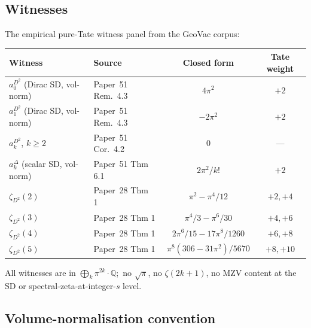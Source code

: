 \documentclass[11pt,a4paper]{article}
\theoremstyle{plain}
\theoremstyle{definition}
\newcommand{\Q}{\mathbb{Q}}
\begin{document}
\subsection{Witnesses}

The empirical pure-Tate witness panel from the GeoVac corpus:

\begin{center}
\begin{tabular}{@{}llcc@{}}
\toprule
Witness & Source & Closed form & Tate weight \\
\midrule
$a_0^{D^2}$ (Dirac SD, vol-norm) & Paper~51 Rem.~4.3~\cite{loutey_paper51} & $4\pi^2$ & $+2$ \\
$a_1^{D^2}$ (Dirac SD, vol-norm) & Paper~51 Rem.~4.3 & $-2\pi^2$ & $+2$ \\
$a_k^{D^2}$, $k \ge 2$ & Paper~51 Cor.~4.2 & $0$ & --- \\
$a_k^\Delta$ (scalar SD, vol-norm) & Paper~51 Thm 6.1 & $2\pi^2/k!$ & $+2$ \\
$\zeta_{D^2}(2)$ & Paper~28 Thm 1~\cite{loutey_paper28} & $\pi^2 - \pi^4/12$ & $+2, +4$ \\
$\zeta_{D^2}(3)$ & Paper~28 Thm 1 & $\pi^4/3 - \pi^6/30$ & $+4, +6$ \\
$\zeta_{D^2}(4)$ & Paper~28 Thm 1 & $2\pi^6/15 - 17\pi^8/1260$ & $+6, +8$ \\
$\zeta_{D^2}(5)$ & Paper~28 Thm 1 & $\pi^8(306 - 31\pi^2)/5670$ & $+8, +10$ \\
\bottomrule
\end{tabular}
\end{center}

All witnesses are in $\bigoplus_k \pi^{2k}\cdot\Q$;\ no $\sqrt\pi$,
no $\zeta(2k+1)$, no MZV content at the SD or spectral-zeta-at-integer-$s$
level.

\subsection{Volume-normalisation convention}
\label{sec:m2_volume_norm}
\end{document}
